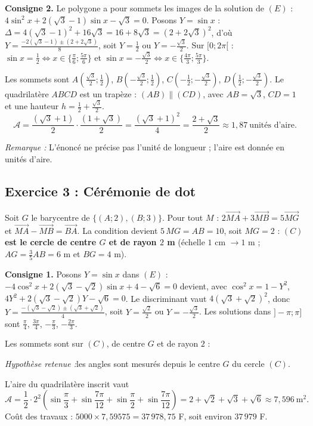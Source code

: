 \documentclass[11pt,a4paper]{article}
\newcommand{\vect}[1]{\overrightarrow{#1}}
\newenvironment{rem}{\par\medskip\noindent\textit{Remarque :}\quad}{\par\medskip}
\newenvironment{hyp}{\par\medskip\noindent\textit{Hypoth\`ese retenue :}\quad}{\par\medskip}
\begin{document}
\textbf{Consigne 2.} Le polygone a pour sommets les images de la solution de
$(E)$ : $4\sin^2x+2(\sqrt3-1)\sin x-\sqrt3=0$.
Posons $Y=\sin x$ : $\Delta=4(\sqrt3-1)^2+16\sqrt3=16+8\sqrt3=(2+2\sqrt3)^2$, d'o\`u
$Y=\frac{-2(\sqrt3-1)\pm(2+2\sqrt3)}{8}$, soit $Y=\frac12$ ou $Y=-\frac{\sqrt3}{2}$.
Sur $[0;2\pi[$ : $\sin x=\frac12\iff x\in\{\frac{\pi}{6};\frac{5\pi}{6}\}$ et
$\sin x=-\frac{\sqrt3}{2}\iff x\in\{\frac{4\pi}{3};\frac{5\pi}{3}\}$.

Les sommets sont $A(\frac{\sqrt3}{2};\frac12)$, $B(-\frac{\sqrt3}{2};\frac12)$, $C(-\frac12;-\frac{\sqrt3}{2})$,
$D(\frac12;-\frac{\sqrt3}{2})$. Le quadrilat\`ere $ABCD$ est un trap\`eze : $(AB)\parallel(CD)$, avec
$AB=\sqrt3$, $CD=1$ et une hauteur $h=\frac12+\frac{\sqrt3}{2}$.
\[
\mathcal A=\frac{(\sqrt3+1)}{2}\cdot\frac{(1+\sqrt3)}{2}=\frac{(\sqrt3+1)^2}{4}=\frac{2+\sqrt3}{2}\approx 1{,}87\ \text{unit\'es d'aire}.
\]
\begin{rem} L'\'enonc\'e ne pr\'ecise pas l'unit\'e de longueur ; l'aire est donn\'ee en unit\'es d'aire.\end{rem}

\subsection{Exercice 3 : C\'er\'emonie de dot}

Soit $G$ le barycentre de $\{(A;2),(B;3)\}$. Pour tout $M$ :
$2\vect{MA}+3\vect{MB}=5\vect{MG}$ et $\vect{MA}-\vect{MB}=\vect{BA}$.
La condition devient $5\,MG=AB=10$, soit $MG=2$ : \textbf{$(C)$ est le cercle de centre $G$ et de rayon $2$ m}
(\'echelle $1$ cm $\to 1$ m ; $AG=\frac35AB=6$ m et $BG=4$ m).

\medskip\noindent\textbf{Consigne 1.} Posons $Y=\sin x$ dans $(E)$ :
$-4\cos^2x+2(\sqrt3-\sqrt2)\sin x+4-\sqrt6=0$ devient, avec $\cos^2x=1-Y^2$,
$4Y^2+2(\sqrt3-\sqrt2)Y-\sqrt6=0$. Le discriminant vaut $4(\sqrt3+\sqrt2)^2$, donc
$Y=\frac{-(\sqrt3-\sqrt2)\pm(\sqrt3+\sqrt2)}{4}$, soit $Y=\frac{\sqrt2}{2}$ ou $Y=-\frac{\sqrt3}{2}$.
Les solutions dans $]-\pi;\pi]$ sont $\frac{\pi}{4}$, $\frac{3\pi}{4}$, $-\frac{\pi}{3}$, $-\frac{2\pi}{3}$.

Les sommets sont sur $(C)$, de centre $G$ et de rayon $2$ :
\begin{hyp}les angles sont mesur\'es depuis le centre $G$ du cercle $(C)$.\end{hyp}
L'aire du quadrilat\`ere inscrit vaut
\[
\mathcal A=\frac12\cdot 2^2\left(\sin\frac{\pi}{3}+\sin\frac{7\pi}{12}+\sin\frac{\pi}{2}+\sin\frac{7\pi}{12}\right)
=2+\sqrt2+\sqrt3+\sqrt6\approx 7{,}596\ \text{m}^2 .
\]
Co\^ut des travaux : $5000\times 7{,}59575=37\,978{,}75$ F, soit environ $37\,979$ F.
\end{document}
